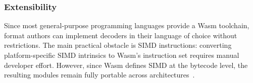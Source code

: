 \subsubsection{Extensibility}

Since most general-purpose programming languages provide a Wasm toolchain, format authors can implement decoders in their language of choice without restrictions. The main practical obstacle is SIMD instructions: converting platform-specific SIMD intrinsics to Wasm's instruction set requires manual developer effort. However, since Wasm defines SIMD at the bytecode level, the resulting modules remain fully portable across architectures~\cite{gienieczkoAnyBloxFrameworkSelfDecoding2025}.